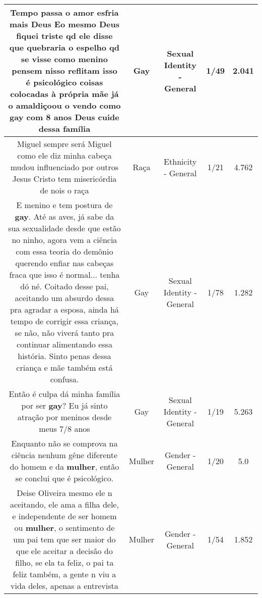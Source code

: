 \documentclass[11pt]{article}
\newlength\mylength
\begin{document}
\begin{center}
\begin{longtable}{|C{.65\mylength}|C{.30\mylength}|C{.12\mylength}|C{.12\mylength}|C{.12\mylength}|}
  \small Tempo passa o amor esfria mais Deus Eo mesmo Deus fiquei triste qd ele disse que quebraria o espelho qd se visse como menino pensem nisso reflitam isso é psicológico coisas colocadas à própria mãe já o amaldiçoou o vendo como \textbf{gay} com 8 anos Deus cuide dessa família\normalsize   & Gay & Sexual Identity - General & 1/49 & 2.041 \\  \hline
  \small Miguel sempre será Miguel como ele diz minha cabeça mudou influenciado por outros Jesus Cristo tem misericórdia de nois o raça\normalsize   & Raça & Ethnicity - General & 1/21 & 4.762 \\  \hline
  \small E menino e tem postura de \textbf{gay}. Até as aves, já sabe da sua sexualidade desde que estão no ninho, agora vem a ciência com essa teoria do demônio querendo enfiar nas cabeças fraca que isso é normal... tenha dó né. Coitado desse pai, aceitando um absurdo dessa pra agradar a esposa, ainda há tempo de corrigir essa criança, se não, não viverá tanto pra continuar alimentando essa história. Sinto penas dessa criança e mãe também está confusa.\normalsize   & Gay & Sexual Identity - General & 1/78 & 1.282 \\  \hline
  \small Então é culpa dá minha família por ser \textbf{gay}? Eu já sinto atração por meninos desde meus 7/8 anos\normalsize   & Gay & Sexual Identity - General & 1/19 & 5.263 \\  \hline
  \small Enquanto não se comprova na ciência nenhum gêne  diferente do homem e da \textbf{mulher}, então se conclui que é psicológico.\normalsize   & Mulher & Gender - General & 1/20 & 5.0 \\  \hline
  \small Deise Oliveira mesmo ele n aceitando, ele ama a filha dele, e independente de ser homem ou \textbf{mulher}, o sentimento de um pai tem que ser maior do que ele aceitar a decisão do filho, se ela ta feliz, o pai ta feliz também, a gente n viu a vida deles, apenas a entrevista\normalsize   & Mulher & Gender - General & 1/54 & 1.852 \\  \hline

\end{longtable}
\end{center}
\end{document}
